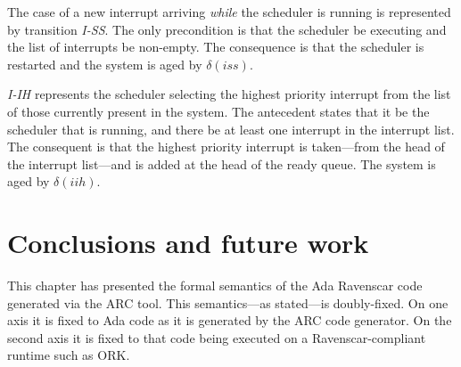 
The case of a new interrupt arriving \emph{while} the scheduler is
running is represented by transition \emph{I-SS}. The only
precondition is that the scheduler be executing and the list of
interrupts be non-empty. The consequence is that the scheduler is
restarted and the system is aged by $\delta(iss)$.


\emph{I-IH} represents the scheduler selecting the highest priority
interrupt from the list of those currently present in the system. The
antecedent states that it be the scheduler that is running, and there
be at least one interrupt in the interrupt list. The consequent is
that the highest priority interrupt is taken---from the head of the
interrupt list---and is added at the head of the ready queue. The
system is aged by $\delta(iih)$.


\section{Conclusions and future work}
This chapter has presented the formal semantics of the Ada Ravenscar
code generated via the ARC tool. This semantics---as stated---is
doubly-fixed. On one axis it is fixed to Ada code as it is generated
by the ARC code generator. On the second axis it is fixed to that code
being executed on a Ravenscar-compliant runtime such as ORK.

